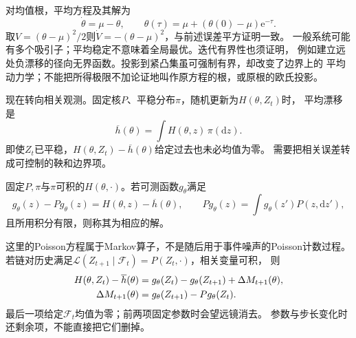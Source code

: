 对均值根，平均方程及其解为
\begin{equation}
  \dot\theta=\mu-\theta,\qquad
  \theta(\tau)=\mu+(\theta(0)-\mu)\mathrm e^{-\tau}.
  \label{eq:stoch-mean-root-ode-solution}
\end{equation}
取$V=(\theta-\mu)^2/2$则$\dot V=-(\theta-\mu)^2$，与前述误差平方证明一致。
一般系统可能有多个吸引子；平均稳定不意味着全局最优。迭代有界性也须证明，
例如建立远处负漂移的径向无界函数。投影到紧凸集虽可强制有界，却改变了边界上的
平均动力学；不能把所得极限不加论证地叫作原方程的根，或原根的欧氏投影。

现在转向相关观测。固定核$P$、平稳分布$\pi$，随机更新为$H(\theta,Z_t)$时，
平均漂移是
\begin{equation}
  \overline h(\theta)=\int H(\theta,z)\,\pi(\mathrm dz).
  \label{eq:stoch-markov-mean-field}
\end{equation}
即使$Z_t$已平稳，$H(\theta,Z_t)-\overline h(\theta)$给定过去也未必均值为零。
需要把相关误差转成可控制的鞅和边界项。
\begin{definition}[Markov核的Poisson方程]
  \label{def:stoch-markov-poisson-equation}
  固定$P,\pi$与$\pi$可积的$H(\theta,\cdot)$。若可测函数$g_\theta$满足
  \begin{equation}
    g_\theta(z)-Pg_\theta(z)=H(\theta,z)-\overline h(\theta),
    \qquad Pg_\theta(z)=\int g_\theta(z')P(z,\mathrm dz'),
    \label{eq:stoch-poisson-equation}
  \end{equation}
  且所用积分有限，则称其为相应的解。
\end{definition}
这里的Poisson方程属于Markov算子，不是随后用于事件噪声的Poisson计数过程。
若链对历史满足$\mathcal L(Z_{t+1}\mid\mathcal F_t)=P(Z_t,\cdot)$，相关变量可积，
则
\begin{align}
  H(\theta,Z_t)-\overline h(\theta)
    &=g_\theta(Z_t)-g_\theta(Z_{t+1})+\Delta M_{t+1}(\theta),
       \label{eq:stoch-poisson-decomposition}\\
  \Delta M_{t+1}(\theta)&=g_\theta(Z_{t+1})-Pg_\theta(Z_t).\notag
\end{align}
最后一项给定$\mathcal F_t$均值为零；前两项固定参数时会望远镜消去。
参数与步长变化时还剩余项，不能直接把它们删掉。

